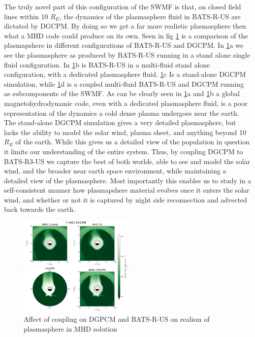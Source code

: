 \documentclass[utf8]{frontiersinFPHY_FAMS}
\begin{document}
The truly novel part of this configuration of the SWMF is that, on closed field lines within 10 $R_{E}$, the dynamics of the plasmasphere fluid in BATS-R-US are dictated by DGCPM. By doing so we get a far more realistic plasmasphere then what a MHD code could produce on its own. Seen in fig \ref{fig:METH1} is a comparison of the plasmapshere in different configurations of BATS-R-US and DGCPM. In \ref{fig:METH1}a we see the plasmasphere as produced by BATS-R-US running in a stand alone single fluid configuration. In \ref{fig:METH1}b is BATS-R-US in a multi-fluid stand alone configuration, with a dedicated plasmasphere fluid. \ref{fig:METH1}c Is a stand-alone DGCPM simulation, while \ref{fig:METH1}d is a coupled multi-fluid BATS-R-US and DGCPM running as subcomponents of the SWMF. As can be clearly seen in \ref{fig:METH1}a and \ref{fig:METH1}b a global magnetohydrodynamic code, even with a dedicated plasmasphere fluid, is a poor representation of the dynamics a cold dense plasma undergoes near the earth. The stand-alone DGCPM simulation gives a very detailed plasmasphere, but lacks the ability to model the solar wind, plasma sheet, and anything beyond 10 $R_{E}$ of the earth. While this gives us a detailed view of the population in question it limits our understanding of the entire system. Thus, by coupling DGCPM to BATS-R3-US we capture the best of both worlds, able to see and model the solar wind, and the broader near earth space environment, while maintaining a detailed view of the plasmasphere. Most importantly this enables us to study in a self-consistent manner how plasmapshere material evolves once it enters the solar wind, and whether or not it is captured by night side reconnection and advected back towards the earth. 

\begin{figure}[!ht]
\begin{center}
\includegraphics[width=0.5\textwidth]{BATS_DGCPM_coupling.png}
\caption{Affect of coupling on DGPCM and BATS-R-US on realism of plasmasphere in MHD solution} 
\label{fig:METH1}
\end{center}
\end{figure}
\end{document}
